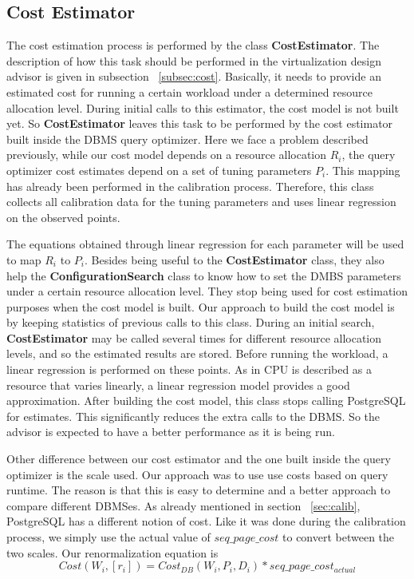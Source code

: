 \subsection{Cost Estimator}

The cost estimation process is performed by the class \textbf{CostEstimator}. The description of how this task should be performed in the virtualization design advisor is given in subsection ~\ref{subsec:cost}. Basically, it needs to provide an estimated cost for running a certain workload under a determined resource allocation level. During initial calls to this estimator, the cost model is not built yet. So \textbf{CostEstimator} leaves this task to be performed by the cost estimator built inside the DBMS query optimizer. Here we face a problem described previously, while our cost model depends on a resource allocation $R_{i}$, the query optimizer cost estimates depend on a set of tuning parameters $P_{i}$. This mapping has already been performed in the calibration process. Therefore, this class collects all calibration data for the tuning parameters and uses linear regression on the observed points. 

The equations obtained through linear regression for each parameter will be used to map $R_{i}$ to $P_{i}$. Besides being useful to the \textbf{CostEstimator} class, they also help the \textbf{ConfigurationSearch} class to know how to set the DMBS parameters under a certain resource allocation level. They stop being used for cost estimation purposes when the cost model is built. Our approach to build the cost model is by keeping statistics of previous calls to this class. During an initial search, \textbf{CostEstimator} may be called several times for different resource allocation levels, and so the estimated results are stored. Before running the workload, a linear regression is performed on these points. As in \cite{Soror:2008:AVM:1376616.1376711} CPU is described as a resource that varies linearly, a linear regression model provides a good approximation. After building the cost model, this class stops calling PostgreSQL for estimates. This significantly reduces the extra calls to the DBMS. So the advisor is 
expected to have a better performance as it is being run.

Other difference between our cost estimator and the one built inside the query optimizer is the scale used. Our approach was to use use costs based on query runtime. The reason is that this is easy to determine and a better approach to compare different DBMSes. As already mentioned in section ~\ref{sec:calib}, PostgreSQL has a different notion of cost. Like it was done during the calibration process, we simply use the actual value of $seq\_page\_cost$ to convert between the two scales. Our renormalization equation is
\[
 Cost(W_{i}, [r_{i}]) = Cost_{DB}(W_{i},P_{i},D_{i}) * seq\_page\_cost_{actual}
\]

